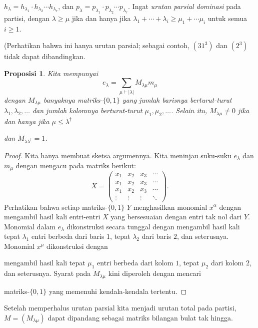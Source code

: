 \documentclass[12pt]{article}
\theoremstyle{plain}
\newtheorem{proposition}[theorem]{Proposisi}
\theoremstyle{definition}
\theoremstyle{remark}
\numberwithin{equation}{section}
\begin{document}
$h_\lambda = h_{\lambda_1}\cdot h_{\lambda_2} \cdots h_{\lambda_r}$, dan
$p_\lambda = p_{\lambda_1}\cdot p_{\lambda_2} \cdots p_{\lambda_r}$.
Ingat \emph{urutan parsial dominasi} pada partisi, dengan $\lambda \ge \mu$
jika dan hanya jika
$\lambda_1 + \cdots + \lambda_i \ge \mu_1 + \cdots \mu_i$
untuk semua $i \ge 1$.

(Perhatikan bahwa ini hanya urutan parsial; sebagai contoh, $(31^3)$ dan $(2^3)$
tidak dapat dibandingkan.
\begin{proposition} \label{prop:01matrix}
Kita mempunyai
\[
e_\lambda = \sum_{\mu \vdash |\lambda|} M_{\lambda \mu} m_\mu
\]
dengan $M_{\lambda \mu}$ banyaknya matriks-$\{0,1\}$ yang jumlah barisnya
berturut-turut $\lambda_1,\lambda_2,\ldots$ dan jumlah kolomnya
berturut-turut $\mu_1,\mu_2,\ldots$.
Selain itu, $M_{\lambda\mu} \ne 0$ jika dan hanya jika $\mu \le \lambda^\dag$

dan $M_{\lambda\lambda^\dag}=1$.
\end{proposition}
\begin{proof}
Kita hanya membuat sketsa argumennya.
Kita meninjau suku-suku $e_\lambda$ dan $m_\mu$ dengan mengacu pada
matriks berikut:
\[
X = \begin{pmatrix}
x_1 & x_2 & x_3 & \cdots \\
x_1 & x_2 & x_3 & \cdots \\
x_1 & x_2 & x_3 & \cdots \\
\vdots & \vdots & \vdots & \ddots
\end{pmatrix}.
\]
Perhatikan bahwa setiap matriks-$\{0,1\}$ $Y$ menghasilkan monomial $x^\alpha$
dengan mengambil hasil kali entri-entri $X$ yang bersesuaian dengan
entri tak nol dari $Y$.
Monomial dalam $e_\lambda$ dikonstruksi secara tunggal dengan
mengambil hasil kali tepat $\lambda_1$ entri berbeda dari baris $1$,
tepat $\lambda_2$ dari baris $2$, dan seterusnya.
Monomial $x^\mu$ dikonstruksi dengan

mengambil hasil kali tepat $\mu_1$ entri berbeda dari kolom $1$,
tepat $\mu_2$ dari kolom $2$, dan seterusnya.
Syarat pada $M_{\lambda\mu}$ kini diperoleh dengan mencari

matriks-$\{0,1\}$ yang memenuhi kendala-kendala tertentu.
\end{proof}
Setelah memperhalus urutan parsial kita menjadi urutan total
pada partisi, $M=\left(M_{\lambda\mu}\right)$ dapat dipandang sebagai
matriks bilangan bulat tak hingga.
\end{document}
